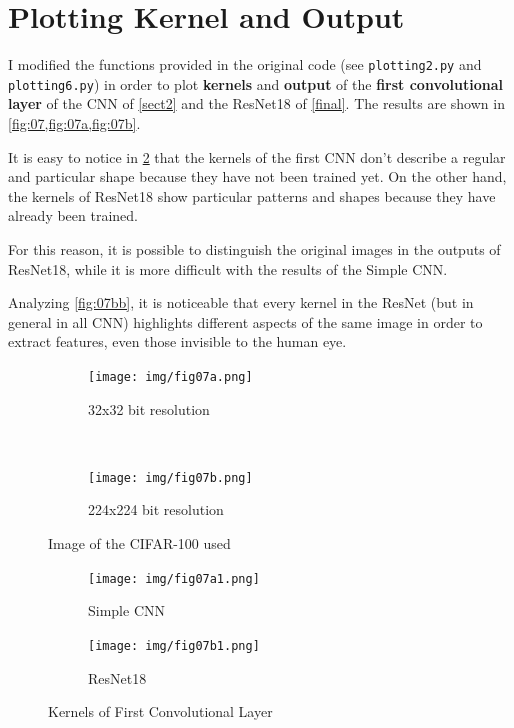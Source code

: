 \documentclass[a4paper, 11pt]{article}
\begin{document}
	\FloatBarrier
	
	\section{Plotting Kernel and Output}
	
	I modified the functions provided in the original code (see \texttt{plotting2.py} and \texttt{plotting6.py}) in order to plot \textbf{kernels} and \textbf{output} of the \textbf{first convolutional layer} of the CNN of \cref{sect2} and the ResNet18 of \cref{final}. The results are shown in \vref{fig:07,fig:07a,fig:07b}.
	
	It is easy to notice in \cref{fig:07a} that the kernels of the first CNN don't describe a regular and particular shape because they have not been trained yet. On the other hand, the kernels of ResNet18 show particular patterns and shapes because they have already been trained.
	
	For this reason, it is possible to distinguish the original images in the outputs of ResNet18, while it is more difficult with the results of the Simple CNN. 
	
	Analyzing \cref{fig:07bb}, it is noticeable that every kernel in the ResNet (but in general in all CNN) highlights different aspects of the same image in order to extract features, even those invisible to the human eye. 
	
	\begin{figure}[h!]
		\centering

		\begin{subfigure}[h]{0.5\textwidth}
			\centering
			\texttt{[image: img/fig07a.png]}
			\caption{32x32 bit resolution}
		\end{subfigure}%
		~ 
		\begin{subfigure}[h]{0.5\textwidth}
			\centering
			\texttt{[image: img/fig07b.png]}
			\caption{224x224 bit resolution}
		\end{subfigure}
		
		\caption{Image of the CIFAR-100 used}
		\label{fig:07}
	\end{figure}

\clearpage

	
	\begin{figure}[h!]
		\centering
		\begin{subfigure}[b]{1\textwidth}
			\centering
			\texttt{[image: img/fig07a1.png]}
			\caption{Simple CNN}
		\end{subfigure}
	
		\begin{subfigure}[b]{1\textwidth}
			\centering
			\texttt{[image: img/fig07b1.png]}
			\caption{ResNet18}
		\end{subfigure}
		\caption{Kernels of First Convolutional Layer}
		\label{fig:07a}
	\end{figure}
\clearpage
\end{document}
